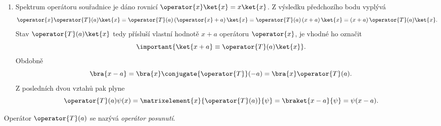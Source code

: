 \begin{solution}
\begin{enumerate}
	\item
        Spektrum operátoru souřadnice je dáno rovnicí $\operator{x}\ket{x}=x\ket{x}$.
        Z výsledku předchozího bodu vyplývá
		\begin{equation}
			\operator{x}\operator{T}(a)\ket{x}
				=\operator{T}(a)\left(\operator{x}+a\right)\ket{x}
				=\operator{T}(a)\left(x+a\right)\ket{x}
				=\left(x+a\right)\operator{T}(a)\ket{x}.
		\end{equation}
		Stav $\operator{T}(a)\ket{x}$ tedy přísluší vlastní hodnotě $x+a$ operátoru $\operator{x}$, je vhodné ho označit
		\begin{equation}
			\important{\ket{x+a}
				\equiv\operator{T}(a)\ket{x}}.
		\end{equation}
		Obdobně
		\begin{equation}
			\bra{x-a}
				=\bra{x}\conjugate{\operator{T}}(-a)
				=\bra{x}\operator{T}(a).
		\end{equation}
		Z posledních dvou vztahů pak plyne
        \begin{equation}\label{eq:TranslationOperatorX}
            \operator{T}(a)\psi(x)
                =\matrixelement{x}{\operator{T}(a)}{\psi}
                =\braket{x-a}{\psi}=\psi(x-a).
		\end{equation}
	\end{enumerate}
\end{solution}

\begin{note}
	Operátor $\operator{T}(a)$ se nazývá \emph{operátor posunutí}.
\end{note}
